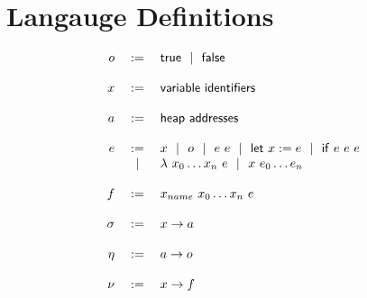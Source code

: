 \documentclass[9pt]{article}
\begin{document}
\section{Langauge Definitions}

\[
	\begin{array}{rcl}
	o &:=& \mathsf{true} ~~|~~ \mathsf{false}\\
	\\
	x &:=& \mathsf{variable~identifiers}\\
	\\
	a &:=& \mathsf{heap~addresses}\\
	\\
	e &:=& x ~~|~~ o ~~|~~ e~e ~~|~~ \mathsf{let}~x:=e ~~|~~ \mathsf{if}~e~e~e\\
	  &~~|~~& \lambda~x_0 \ldots x_n~e ~~|~~ x~e_0 \ldots e_n\\
	\\
	f &:=& x_{name}~x_0 \ldots x_n~e\\
	\\
	\sigma &:=& x \rightarrow a\\
	\\
	\eta &:=& a \rightarrow o\\
	\\
	\nu &:=& x \rightarrow f\\
	\\
	\end{array}
\]
\end{document}
